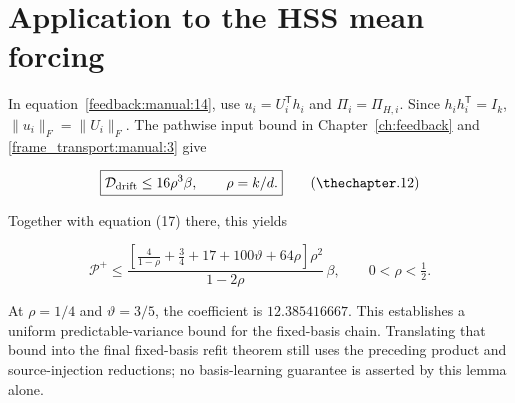 \documentclass[11pt,oneside,openany,a4paper]{book}
\numberwithin{equation}{chapter}
\theoremstyle{definition}
\theoremstyle{remark}
\newcommand{\proofstep}[1]{\par\addvspace{.45\baselineskip}\Needspace{3\baselineskip}\textbf{#1}\par\nobreak}
\newcommand{\R}{\mathbb R}\newcommand{\E}{\mathbb E}\newcommand{\Prb}{\mathbb P}\newcommand{\PP}{\mathbb P}
\newcommand{\T}{\mathsf T}\newcommand{\Id}{I}
\newcommand{\F}[1]{\left\lVert#1\right\rVert_F}
\newcommand{\N}[1]{\left\lVert#1\right\rVert}
\newcommand{\op}[1]{\left\lVert#1\right\rVert_{\rm op}}
\newcommand{\ip}[2]{\left\langle#1,#2\right\rangle_F}
\DeclareMathOperator{\tr}{tr}\DeclareMathOperator{\rank}{rank}
\DeclareMathOperator{\diag}{blockdiag}\DeclareMathOperator{\range}{range}
\DeclareMathOperator{\HSS}{HSS}\DeclareMathOperator{\dist}{dist}
\DeclareMathOperator{\Var}{Var}\DeclareMathOperator{\supp}{supp}
\newcommand{\UC}{\mathcal U}\newcommand{\VC}{\mathcal V}\newcommand{\err}{\mathcal E}
\newcommand{\Sn}[2]{\left\lVert#1\right\rVert_{S_{#2}}}
\newcommand{\Cov}{\mathsf C}\newcommand{\Loss}{\mathsf L}\newcommand{\Fil}{\mathcal F}
\DeclareMathOperator{\diver}{div}\DeclareMathOperator{\vecop}{vec}\DeclareMathOperator{\Gammafun}{Gamma}
\begin{document}
\section{Application to the HSS mean forcing}\label{frame_transport:application-to-the-hss-mean-forcing}

In equation~\eqref{feedback:manual:14}, use \(u_i=U_i^{\mathsf T}h_i\) and \(\Pi_i=\Pi_{H,i}\). Since \(h_i h_i^{\mathsf T}=I_k\), \(\|u_i\|_F=\|U_i\|_F\). The pathwise input bound in Chapter~\ref{ch:feedback} and \eqref{frame_transport:manual:3} give

\[
\boxed{\mathcal D_{\rm drift}\le16\rho^3\beta,\qquad \rho=k/d.}
\tag{\thechapter.12}\label{frame_transport:manual:12}
\]

Together with equation (17) there, this yields

\[
\mathcal P^+\le
\frac{\left[\frac4{1-\rho}+\frac34+17+100\vartheta+64\rho\right]\rho^2}
{1-2\rho}\,\beta,\qquad 0<\rho<\tfrac12.
\tag{\thechapter.13}\label{frame_transport:manual:13}
\]

At \(\rho=1/4\) and \(\vartheta=3/5\), the coefficient is \(12.385416667\). This establishes a uniform predictable-variance bound for the fixed-basis chain. Translating that bound into the final fixed-basis refit theorem still uses the preceding product and source-injection reductions; no basis-learning guarantee is asserted by this lemma alone.

\endgroup

\begingroup
\let\R\relax
\newcommand{\R}{\mathbb R}
\let\E\relax
\newcommand{\E}{\mathbb E}
\let\Prb\relax
\newcommand{\Prb}{\mathbb P}
\let\T\relax
\newcommand{\T}{\mathsf T}
\let\F\relax
\newcommand{\F}[1]{\left\lVert#1\right\rVert_{F}}
\let\N\relax
\newcommand{\N}[1]{\left\lVert#1\right\rVert}
\let\ip\relax
\newcommand{\ip}[2]{\left\langle#1,#2\right\rangle_F}
\let\tr\relax
\newcommand{\tr}{\operatorname{tr}}
\let\rank\relax
\newcommand{\rank}{\operatorname{rank}}
\let\diag\relax
\newcommand{\diag}{\operatorname{blockdiag}}
\let\range\relax
\newcommand{\range}{\operatorname{range}}
\let\OPT\relax
\newcommand{\OPT}{\operatorname{OPT}}
\let\HSS\relax
\newcommand{\HSS}{\operatorname{HSS}}
\let\diver\relax
\newcommand{\diver}{\operatorname{div}}
\let\Var\relax
\newcommand{\Var}{\operatorname{Var}}
\let\UC\relax
\newcommand{\UC}{\mathcal U}
\let\VC\relax
\newcommand{\VC}{\mathcal V}
\let\err\relax
\newcommand{\err}{\mathcal E}
\let\proofstep\relax
\newcommand{\proofstep}[1]{\par\addvspace{.45\baselineskip}\Needspace{3\baselineskip}\textbf{#1}\par\nobreak}
\let\op\relax
\newcommand{\op}[1]{\left\lVert#1\right\rVert_{\mathrm{op}}}
\let\Sn\relax
\newcommand{\Sn}[2]{\left\lVert#1\right\rVert_{S_{#2}}}
\let\Cov\relax
\newcommand{\Cov}{\mathsf C}
\let\Loss\relax
\newcommand{\Loss}{\mathsf L}
\let\Fil\relax
\newcommand{\Fil}{\mathcal F}
\let\Id\relax
\newcommand{\Id}{I}
\let\supp\relax
\newcommand{\supp}{\operatorname{supp}}
\let\vecop\relax
\newcommand{\vecop}{\operatorname{vec}}
\let\Gammafun\relax
\newcommand{\Gammafun}{\operatorname{Gamma}}
\end{document}
